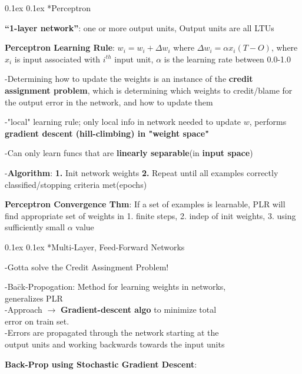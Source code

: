 \documentclass[10pt,landscape]{article}
\makeatletter
\renewcommand{\subsection}{\@startsection{subsection}{2}{0mm}%
                                {0.1ex}%
                                {0.1ex}%
                                {\normalfont\footnotesize\bfseries}}
\makeatother
\begin{document}
\begin{multicols}{3}
\subsection{*Perceptron}

\textbf{``1-layer network''}: one or more output units, Output units are all LTUs

\textbf{Perceptron Learning Rule}: $w_i = w_i + \Delta w_i$ where $\Delta w_i = \alpha x_i(T-O)$, where $x_i$ is input associated with $i^{th}$ input unit, $\alpha$ is the learning rate between 0.0-1.0

-Determining how to update the weights is an instance of the \textbf{credit assignment problem}, which is determining which weights to credit/blame for the output error in the network, and how to update them

-"local" learning rule; only local info in network needed to update $w$, performs \textbf{gradient descent (hill-climbing) in "weight space"}

-Can only learn funcs that are \textbf{linearly separable}(in \textbf{input space})

-\textbf{Algorithm}: \textbf{1.} Init network weights \textbf{2.} Repeat until all examples correctly classified/stopping criteria met(epochs)

\textbf{Perceptron Convergence Thm}: If a set of examples is learnable, PLR will find appropriate set of weights in 1. finite steps, 2. indep of init weights, 3. using sufficiently small $\alpha$ value

\subsection{*Multi-Layer, Feed-Forward Networks}

-Gotta solve the Credit Assingment Problem!

\begin{tabbing}
-Ba\=ck-Propogation: Method for learning weights in networks, \\
        generalizes PLR\\
\>-Approach $\to$ \textbf{Gradient-descent algo} to minimize total \\\>error on train set. \\
\>-Errors are propagated through the network starting at the \\\>output units and working backwards towards the input units
\end{tabbing}

\textbf{Back-Prop using Stochastic Gradient Descent}:


\end{multicols}
\end{document}

